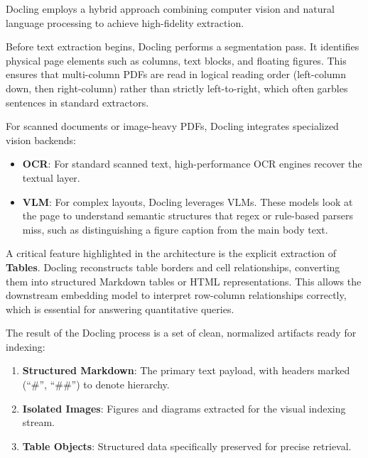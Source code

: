 Docling employs a hybrid approach combining computer vision and natural language processing to achieve high-fidelity extraction.


Before text extraction begins, Docling performs a segmentation pass. It identifies physical page elements such as columns, text blocks, and floating figures. This ensures that multi-column PDFs are read in logical reading order (left-column down, then right-column) rather than strictly left-to-right, which often garbles sentences in standard extractors.


For scanned documents or image-heavy PDFs, Docling integrates specialized vision backends:
\begin{itemize}
    \item \textbf{OCR}: For standard scanned text, high-performance OCR engines recover the textual layer.
    \item \textbf{VLM}: For complex layouts, Docling leverages VLMs. These models look at the page to understand semantic structures that regex or rule-based parsers miss, such as distinguishing a figure caption from the main body text.
\end{itemize}


A critical feature highlighted in the architecture is the explicit extraction of \textbf{Tables}. Docling reconstructs table borders and cell relationships, converting them into structured Markdown tables or HTML representations. This allows the downstream embedding model to interpret row-column relationships correctly, which is essential for answering quantitative queries.

The result of the Docling process is a set of clean, normalized artifacts ready for indexing:
\begin{enumerate}
    \item \textbf{Structured Markdown}: The primary text payload, with headers marked (``\#'', ``\#\#'') to denote hierarchy.
    \item \textbf{Isolated Images}: Figures and diagrams extracted for the visual indexing stream.
    \item \textbf{Table Objects}: Structured data specifically preserved for precise retrieval.
\end{enumerate}

